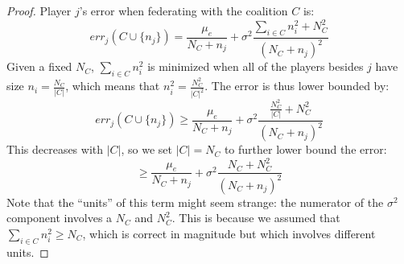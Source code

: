 \documentclass{article}
\newcommand{\mue}[0]{\ensuremath{\mu_e}}
\newcommand{\var}[0]{\ensuremath{\sigma^2}}
\newcommand{\ndraw}[0]{\ensuremath{n}}
\newcommand{\total}[0]{\ensuremath{N}}
\newcommand{\col}[0]{\ensuremath{C}}
\begin{document}
\lowerbounderror*

\begin{proof}
Player $j$'s error when federating with the coalition $\col$ is: 
$$err_j(\col \cup \{\ndraw_j\}) = \frac{\mue}{\total_\col + \ndraw_j} + \var \frac{\sum_{i \in \col}\ndraw_i^2 + \total_\col^2}{(\total_\col + \ndraw_j)^2}$$
Given a fixed $\total_{\col}$, $\sum_{i \in \col} \ndraw_i^2$ is minimized when all of the players besides $j$ have size $\ndraw_i = \frac{\total_\col}{\vert \col \vert}$, which means that  $\ndraw_i^2 = \frac{\total_\col^2}{\vert \col \vert^2}$. The error is thus lower bounded by: 
$$err_j(\col \cup \{\ndraw_j\}) \geq \frac{\mue}{\total_\col + \ndraw_j} + \var \frac{\frac{\total_\col^2}{\vert \col \vert} + \total_\col^2}{(\total_\col + \ndraw_j)^2}$$
This decreases with $\vert \col \vert$, so we set $\vert \col \vert = \total_\col$ to further lower bound the error: 
$$\geq \frac{\mue}{\total_\col + \ndraw_j} + \var \frac{\total_\col + \total_\col^2}{(\total_\col + \ndraw_j)^2}$$
Note that the \enquote{units} of this term might seem strange: the numerator of the $\var$ component involves a $\total_{\col}$ and $\total_{\col}^2$. This is because we assumed that $\sum_{i \in \col} \ndraw_i^2 \geq \total_{\col}$, which is correct in magnitude but which involves different units. 


\end{proof}
\end{document}
